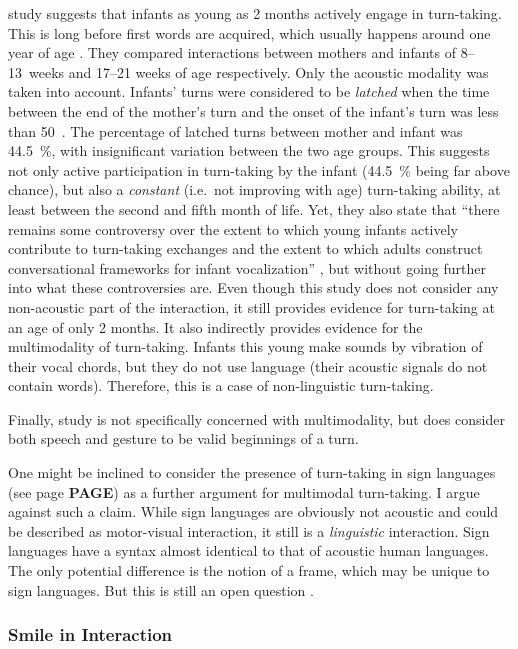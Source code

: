  study suggests that infants as young as 2 months actively engage in turn-taking.
This is long before first words are acquired, which usually happens around one year of age \citep[, ]{lenneberg_biological_1967,szagun_sprachentwicklung_2013}.
 They compared interactions between mothers and infants of 8--13~weeks and 17--21 weeks of age respectively.
Only the acoustic modality was taken into account.
Infants' turns were considered to be \emph{latched} when the time between the end of the mother's turn and the onset of the infant's turn was less than 50~\ms.
The percentage of latched turns between mother and infant was 44.5~\%, with insignificant variation between the two age groups.
This suggests not only active participation in turn-taking by the infant (44.5~\% being far above chance), but also a \emph{constant} (i.e.\ not improving with age) turn-taking ability, at least between the second and fifth month of life.
Yet, they also state that ``there remains some controversy over the extent to which young infants actively contribute to turn-taking exchanges and the extent to which adults construct conversational frameworks for infant vocalization'' \citep[]{gratier_early_2015}, but without going further into what these controversies are.
Even though this study does not consider any non-acoustic part of the interaction, it still provides evidence for turn-taking at an age of only 2 months.
It also indirectly provides evidence for the multimodality of turn-taking.
Infants this young make sounds by vibration of their vocal chords, but they do not use language (their acoustic signals do not contain words).
Therefore, this is a case of non-linguistic turn-taking.

Finally,  study is not specifically concerned with multimodality, but does consider both speech and gesture to be valid beginnings of a turn.

One might be inclined to consider the presence of turn-taking in sign languages (see page \textbf{PAGE}) as a further argument for multimodal turn-taking.
I argue against such a claim.
While sign languages are obviously not acoustic and could be described as motor-visual interaction, it still is a \emph{linguistic} interaction.
Sign languages have a syntax almost identical to that of acoustic human languages.
The only potential difference is the notion of a frame, which may be unique to sign languages.
But this is still an open question \citep{source}.

\subsubsection{Smile in Interaction}
